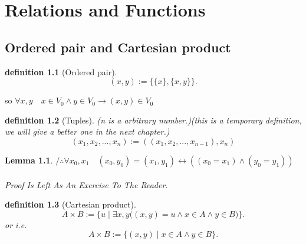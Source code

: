 \documentclass[10pt,a4paper]{book}
\newtheorem{definition}{definition}[section]
\newtheorem{lemma}{Lemma}[section]
\begin{document}
\chapter{Relations and Functions}

\section{Ordered pair and Cartesian product}

\begin{definition}[Ordered pair]
    \[ (x,y) := \{ \{x\},\{x,y\} \}. \]
\end{definition}

so $\forall x,y \quad x \in V_0  \land y  \in V_0  \to (x,y)  \in V_0 $

\begin{definition}[Tuples](n is a arbitrary number.)(this is a temporary definition, we will give a better one in the next chapter.)
    \[ (x_1,x_2,...,x_n) := ((x_1,x_2,...,x_{n-1}),x_n) \]
\end{definition}

\begin{lemma} $/ \therefore \forall x_0,x_1 \quad  (x_0,y_0) = (x_1,y_1) \leftrightarrow ((x_0=x_1) \wedge (y_0=y_1))$
    \\
    \\
    Proof Is Left As An Exercise To The Reader.
\end{lemma}

\begin{definition}[Cartesian product]
    \[ A \times B := \{ u \mid \exists x,y \Big((x,y)=u \land x \in A \land y\in B \Big)\}. \]
    or i.e.
    \[ A \times B := \{ (x,y) \mid x \in A \land y\in B \}. \]
\end{definition}
\end{document}

